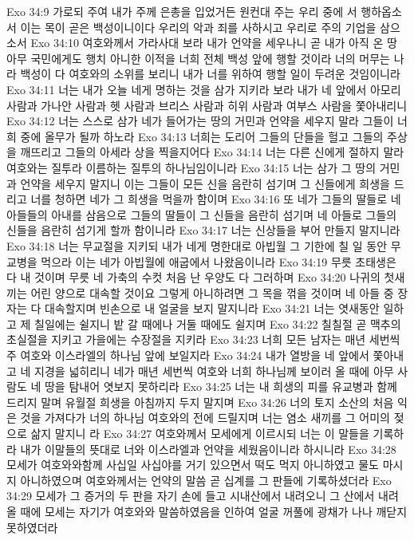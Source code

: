 Exo 34:9  가로되 주여 내가 주께 은총을 입었거든 원컨대 주는 우리 중에 서 행하옵소서 이는 목이 곧은 백성이니이다 우리의 악과 죄를 사하시고 우리로 주의 기업을 삼으소서
Exo 34:10  여호와께서 가라사대 보라 내가 언약을 세우나니 곧 내가 아직 온 땅 아무 국민에게도 행치 아니한 이적을 너희 전체 백성 앞에 행할 것이라 너의 머무는 나라 백성이 다 여호와의 소위를 보리니 내가 너를 위하여 행할 일이 두려운 것임이니라
Exo 34:11  너는 내가 오늘 네게 명하는 것을 삼가 지키라 보라 내가 네 앞에서 아모리 사람과 가나안 사람과 헷 사람과 브리스 사람과 히위 사람과 여부스 사람을 쫓아내리니
Exo 34:12  너는 스스로 삼가 네가 들어가는 땅의 거민과 언약을 세우지 말라 그들이 너희 중에 올무가 될까 하노라
Exo 34:13  너희는 도리어 그들의 단들을 헐고 그들의 주상을 깨뜨리고 그들의 아세라 상을 찍을지어다
Exo 34:14  너는 다른 신에게 절하지 말라 여호와는 질투라 이름하는 질투의 하나님임이니라
Exo 34:15  너는 삼가 그 땅의 거민과 언약을 세우지 말지니 이는 그들이 모든 신을 음란히 섬기며 그 신들에게 희생을 드리고 너를 청하면 네가 그 희생을 먹을까 함이며
Exo 34:16  또 네가 그들의 딸들로 네 아들들의 아내를 삼음으로 그들의 딸들이 그 신들을 음란히 섬기며 네 아들로 그들의 신들을 음란히 섬기게 할까 함이니라
Exo 34:17  너는 신상들을 부어 만들지 말지니라
Exo 34:18  너는 무교절을 지키되 내가 네게 명한대로 아빕월 그 기한에 칠 일 동안 무교병을 먹으라 이는 네가 아빕월에 애굽에서 나왔음이니라
Exo 34:19  무릇 초태생은 다 내 것이며 무릇 네 가축의 수컷 처음 난 우양도 다 그러하며
Exo 34:20  나귀의 첫새끼는 어린 양으로 대속할 것이요 그렇게 아니하려면 그 목을 꺾을 것이며 네 아들 중 장자는 다 대속할지며 빈손으로 내 얼굴을 보지 말지니라
Exo 34:21  너는 엿새동안 일하고 제 칠일에는 쉴지니 밭 갈 때에나 거둘 때에도 쉴지며
Exo 34:22  칠칠절 곧 맥추의 초실절을 지키고 가을에는 수장절을 지키라
Exo 34:23  너희 모든 남자는 매년 세번씩 주 여호와 이스라엘의 하나님 앞에 보일지라
Exo 34:24  내가 열방을 네 앞에서 쫓아내고 네 지경을 넓히리니 네가 매년 세번씩 여호와 너희 하나님께 보이러 올 때에 아무 사람도 네 땅을 탐내어 엿보지 못하리라
Exo 34:25  너는 내 희생의 피를 유교병과 함께 드리지 말며 유월절 희생을 아침까지 두지 말지며
Exo 34:26  너의 토지 소산의 처음 익은 것을 가져다가 너의 하나님 여호와의 전에 드릴지며 너는 염소 새끼를 그 어미의 젖으로 삶지 말지니 라
Exo 34:27  여호와께서 모세에게 이르시되 너는 이 말들을 기록하라 내가 이말들의 뜻대로 너와 이스라엘과 언약을 세웠음이니라 하시니라
Exo 34:28  모세가 여호와와함께 사십일 사십야를 거기 있으면서 떡도 먹지 아니하였고 물도 마시지 아니하였으며 여호와께서는 언약의 말씀 곧 십계를 그 판들에 기록하셨더라
Exo 34:29  모세가 그 증거의 두 판을 자기 손에 들고 시내산에서 내려오니 그 산에서 내려올 때에 모세는 자기가 여호와와 말씀하였음을 인하여 얼굴 꺼풀에 광채가 나나 깨닫지 못하였더라
